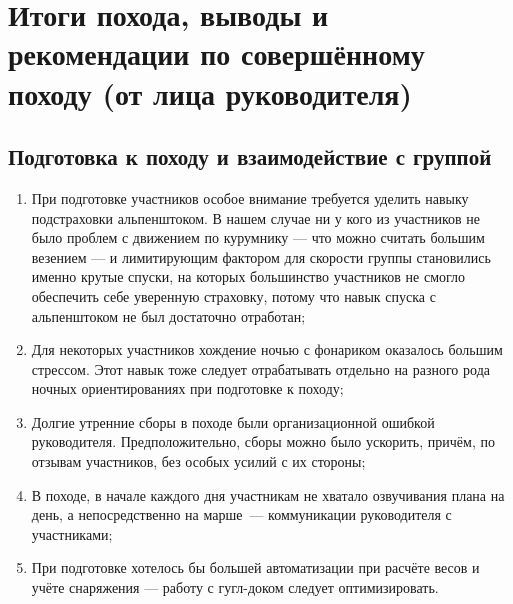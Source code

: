 \section{Итоги похода, выводы и рекомендации по совершённому походу (от лица руководителя)}

\subsection{Подготовка к походу и взаимодействие с группой} 
	\begin{enumerate}
		\item При подготовке участников особое внимание требуется уделить навыку подстраховки альпенштоком. В нашем случае ни у кого из участников не было проблем с движением по курумнику --- что можно считать большим везением --- и лимитирующим фактором для скорости группы становились именно крутые спуски, на которых большинство участников не смогло обеспечить себе уверенную страховку, потому что навык спуска с альпенштоком не был достаточно отработан; 
		\item Для некоторых участников хождение ночью с фонариком оказалось большим стрессом. Этот навык тоже следует отрабатывать отдельно на разного рода ночных ориентированиях при подготовке к походу; %
		\item Долгие утренние сборы в походе были организационной ошибкой руководителя. Предположительно, сборы можно было ускорить, причём, по отзывам участников, без особых усилий с их стороны; 
		\item В походе, в начале каждого дня участникам не хватало озвучивания плана на день, а непосредственно на марше~--- коммуникации руководителя с участниками; 
		\item При подготовке хотелось бы большей автоматизации при расчёте весов и учёте снаряжения --- работу с гугл-доком следует оптимизировать.
	\end{enumerate} 
	
